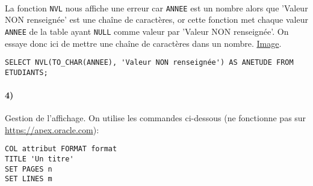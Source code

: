 \documentclass{report}
\begin{document}
\paragraph{}La fonction {\tt NVL} nous affiche une erreur car {\tt ANNEE} est un nombre alors que 'Valeur NON renseignée' est une chaîne de caractères, or cette fonction met chaque valeur {\tt ANNEE} de la table ayant {\tt NULL} comme valeur par 'Valeur NON renseignée'. On essaye donc ici de mettre une chaîne de caractères dans un nombre. \href{run:./Images/TP3/tp3_4.png}{Image}.
\begin{lstlisting}
SELECT NVL(TO_CHAR(ANNEE), 'Valeur NON renseignée') AS ANETUDE FROM ETUDIANTS;
\end{lstlisting}

\paragraph{4)}Gestion de l'affichage. On utilise les commandes ci-dessous (ne fonctionne pas sur \url{https://apex.oracle.com}):
\begin{lstlisting}
COL attribut FORMAT format
TITLE 'Un titre'
SET PAGES n
SET LINES m
\end{lstlisting}
\end{document}
